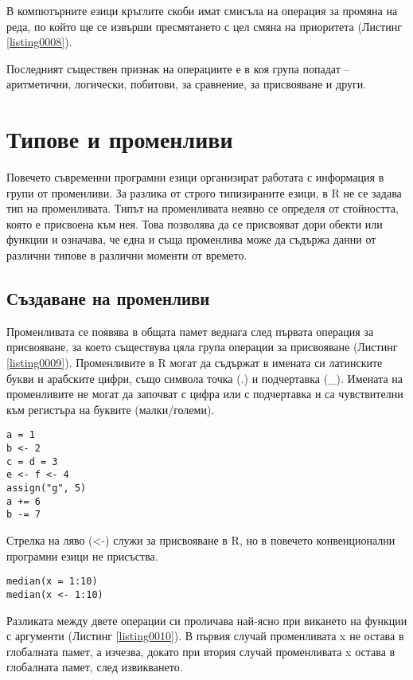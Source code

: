 В компютърните езици кръглите скоби имат смисъла на операция за промяна на реда, по който ще се извърши пресмятането с цел смяна на приоритета (Листинг \ref{listing0008}).

Последният съществен признак на операциите е в коя група попадат – аритметични, логически, побитови, за сравнение, за присвояване и други.

\section{Типове и променливи}

Повечето съвременни програмни езици организират работата с информация в групи от променливи. За разлика от строго типизираните езици, в R не се задава тип на променливата. Типът на променливата неявно се определя от стойността, която е присвоена към нея. Това позволява да се присвояват дори обекти или функции и означава, че една и съща променлива може да съдържа данни от различни типове в различни моменти от времето.

\subsection{Създаване на променливи}

Променливата се появява в общата памет веднага след първата операция за присвояване, за което съществува цяла група операции за присвояване (Листинг \ref{listing0009}). Променливите в R могат да съдържат в имената си латинските букви и арабските цифри, също символа точка (.) и подчертавка (\_). Имената на променливите не могат да започват с цифра или с подчертавка и са чувствителни към регистъра на буквите (малки/големи).

\begin{lstlisting}[caption=Операции за присвояване, label=listing0009]
a = 1
b <- 2
c = d = 3
e <- f <- 4
assign("g", 5)
a += 6
b -= 7
\end{lstlisting}

Стрелка на ляво (<-) служи за присвояване в R, но в повечето конвенционални програмни езици не присъства.

\begin{lstlisting}[caption=Алтернативи за операцията присвояване, label=listing0010]
median(x = 1:10)
median(x <- 1:10)
\end{lstlisting}

Разликата между двете операции си проличава най-ясно при викането на функции с аргументи (Листинг \ref{listing0010}). В първия случай променливата x не остава в глобалната памет, а изчезва, докато при втория случай променливата x остава в глобалната памет, след извикването.

